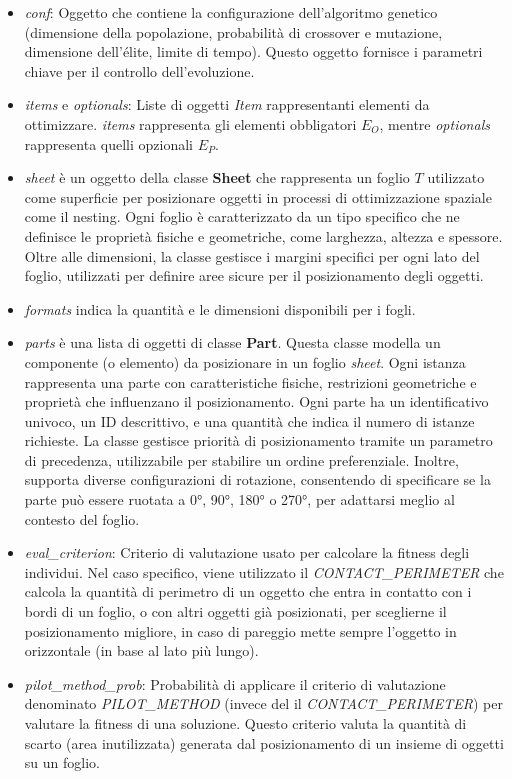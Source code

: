 \begin{itemize}
    \item \emph{conf}: Oggetto che contiene la configurazione dell'algoritmo genetico (dimensione della popolazione, probabilità di crossover e mutazione, dimensione dell'élite, limite di tempo). Questo oggetto fornisce i parametri chiave per il controllo dell'evoluzione.
    \item \emph{items} e \emph{optionals}: Liste di oggetti \emph{Item} rappresentanti elementi da ottimizzare. \emph{items} rappresenta gli elementi obbligatori \(E_O\), mentre \emph{optionals} rappresenta quelli opzionali \(E_P\).
    \item \emph{sheet} è un oggetto della classe \textbf{Sheet} che rappresenta un foglio \(T\) utilizzato come superficie per posizionare oggetti in processi di ottimizzazione spaziale come il nesting. Ogni foglio è caratterizzato da un tipo specifico che ne definisce le proprietà fisiche e geometriche, come larghezza, altezza e spessore. Oltre alle dimensioni, la classe gestisce i margini specifici per ogni lato del foglio, utilizzati per definire aree sicure per il posizionamento degli oggetti. 
    \item \emph{formats} indica la quantità e le dimensioni disponibili per i fogli.
    \item \emph{parts} è una lista di oggetti di classe \textbf{Part}. Questa classe modella un componente (o elemento) da posizionare in un foglio \emph{sheet}. Ogni istanza rappresenta una parte con caratteristiche fisiche, restrizioni geometriche e proprietà che influenzano il posizionamento. Ogni parte ha un identificativo univoco, un ID descrittivo, e una quantità che indica il numero di istanze richieste. La classe gestisce priorità di posizionamento tramite un parametro di precedenza, utilizzabile per stabilire un ordine preferenziale. Inoltre, supporta diverse configurazioni di rotazione, consentendo di specificare se la parte può essere ruotata a 0°, 90°, 180° o 270°, per adattarsi meglio al contesto del foglio.
    \item \emph{eval\_criterion}: Criterio di valutazione usato per calcolare la fitness degli individui. Nel caso specifico, viene utilizzato il \emph{CONTACT\_PERIMETER} che calcola la quantità di perimetro di un oggetto che entra in contatto con i bordi di un foglio, o con altri oggetti già posizionati, per sceglierne il posizionamento migliore, in caso di pareggio mette sempre l'oggetto in orizzontale (in base al lato più lungo).
    \item \emph{pilot\_method\_prob}: Probabilità di applicare il criterio di valutazione denominato \emph{PILOT\_METHOD} (invece del il \emph{CONTACT\_PERIMETER}) per valutare la fitness di una soluzione. Questo criterio valuta la quantità di scarto (area inutilizzata) generata dal posizionamento di un insieme di oggetti su un foglio.

\end{itemize}
